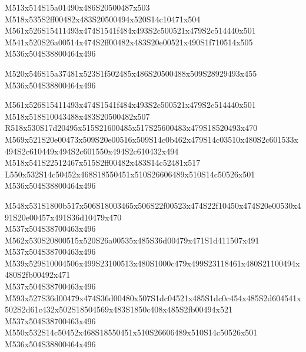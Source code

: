 \documentclass{article}
\begin{document}
\begin{multicols}{5}
\begin{center}
M513x514S15a01490x486S20500487x503 %
\\M518x535S2ff00482x483S20500494x520S14c10471x504 %
\\M561x526S15411493x474S1541f484x493S2c500521x479S2c514440x501 %
\\M541x520S26a00514x474S2ff00482x483S20e00521x490S1f710514x505 %
\\M536x504S38800464x496 %

M520x546S15a37481x523S1f502485x486S20500488x509S28929493x455 %
\\M536x504S38800464x496 %

M561x526S15411493x474S1541f484x493S2c500521x479S2c514440x501 %
\\M518x518S10043488x483S20500482x507 %
\\R518x530S17d20495x515S21600485x517S25600483x479S18520493x470 %
\\M569x521S20e00473x509S20e00516x509S14c0b462x479S14c03510x480S2c601533x494S2c610449x494S2c601550x494S2c610432x494 %
\\M518x541S22512467x515S2ff00482x483S14c52481x517 %
\\L550x532S14c50452x468S18550451x510S26606489x510S14c50526x501 %
\\M536x504S38800464x496 %

M548x531S1800b517x506S18003465x506S22f00523x474S22f10450x474S20e00530x491S20e00457x491S36d10479x470 %
\\M537x504S38700463x496 %
\\M562x530S20800515x520S26a00535x485S36d00479x471S1d411507x491 %
\\M537x504S38700463x496 %
\\M539x529S10004506x499S23100513x480S1000c479x499S23118461x480S21100494x480S2fb00492x471 %
\\M537x504S38700463x496 %
\\M593x527S36d00479x474S36d00480x507S1dc04521x485S1dc0c454x485S2d604541x502S2d61c432x502S18504569x483S1850c408x485S2fb00494x521 %
\\M537x504S38700463x496 %
\\M550x532S14c50452x468S18550451x510S26606489x510S14c50526x501 %
\\M536x504S38800464x496 %


\end{center}
\end{multicols}
\end{document}
